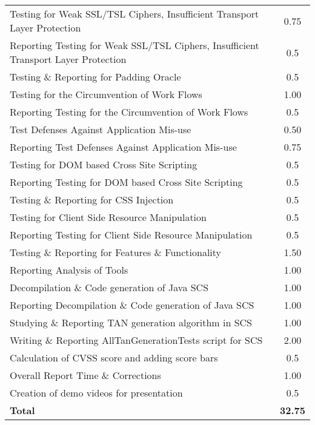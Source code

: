 \begin{table}[H]
\begin{tabular*}{\textwidth}{@{\extracolsep{\fill}} l c@{\extracolsep{0pt}} }
Testing for Weak SSL/TSL Ciphers, Insufficient Transport Layer Protection & 0.75 \\
Reporting Testing for Weak SSL/TSL Ciphers, Insufficient Transport Layer Protection & 0.5 \\
Testing \& Reporting for Padding Oracle	    & 0.5 \\
Testing for the Circumvention of Work Flows	& 1.00 \\
Reporting Testing for the Circumvention of Work Flows & 0.5 \\
Test Defenses Against Application Mis-use	& 0.50 \\
Reporting Test Defenses Against Application Mis-use & 0.75 \\
Testing for DOM based Cross Site Scripting	& 0.5 \\
Reporting Testing for DOM based Cross Site Scripting & 0.5 \\
Testing \& Reporting for CSS Injection	    & 0.5 \\
Testing for Client Side Resource Manipulation & 0.5 \\
Reporting Testing for Client Side Resource Manipulation & 0.5 \\
Testing \& Reporting for Features \& Functionality & 1.50 \\
Reporting Analysis of Tools                 & 1.00 \\
Decompilation \& Code generation of Java SCS & 1.00 \\
Reporting Decompilation \& Code generation of Java SCS & 1.00 \\
Studying \& Reporting TAN generation algorithm in SCS   & 1.00 \\
Writing \& Reporting AllTanGenerationTests script for SCS & 2.00 \\
Calculation of CVSS score and adding score bars & 0.5 \\
Overall Report Time \& Corrections			& 1.00 \\
Creation of demo videos for presentation    & 0.5 \\
\hline\hline
\textbf{Total}								& \textbf{32.75}
\end{tabular*}
\end{table}